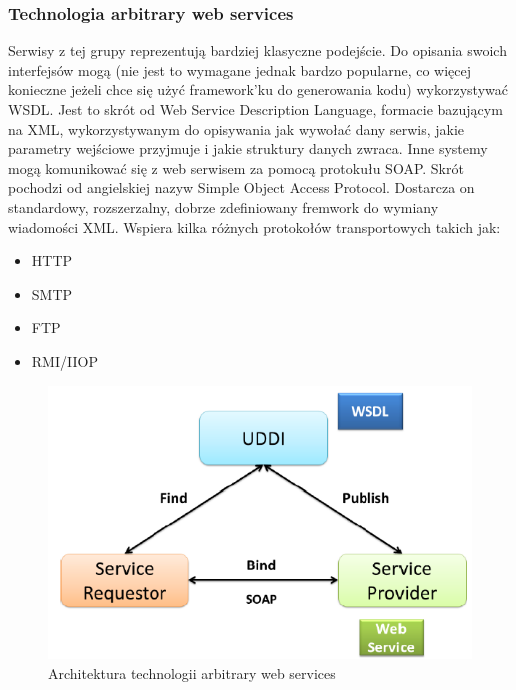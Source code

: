 \subsubsection{Technologia arbitrary web services}
Serwisy z tej grupy reprezentują bardziej klasyczne podejście. Do opisania swoich interfejsów mogą (nie jest to wymagane jednak bardzo popularne, co więcej konieczne jeżeli chce się użyć framework'ku do generowania kodu) wykorzystywać WSDL. Jest to skrót od Web Service Description Language, formacie bazującym na XML, wykorzystywanym do opisywania jak wywołać dany serwis, jakie parametry wejściowe przyjmuje i jakie struktury danych zwraca. Inne systemy mogą komunikować się z web serwisem za pomocą protokułu SOAP. Skrót pochodzi od angielskiej nazyw Simple Object Access Protocol. Dostarcza on standardowy, rozszerzalny, dobrze zdefiniowany fremwork do wymiany wiadomości XML. Wspiera kilka różnych protokołów transportowych takich jak:
 \begin{itemize}
	\item HTTP
	\item SMTP
	\item FTP
	\item RMI/IIOP
\end{itemize}  
\begin{figure}[!h]
	\centering
	\includegraphics[scale=0.50]{webSerwisyArchitektura.png} 
	\caption{Architektura technologii arbitrary web services}
\end{figure}

